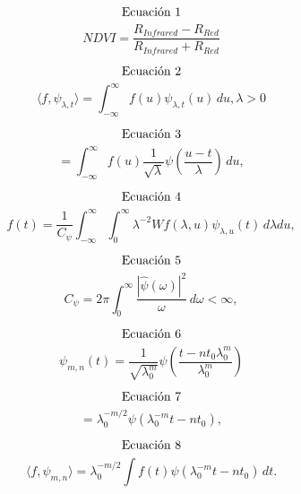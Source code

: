 \documentclass{article}
\begin{document}
$$\textnormal{Ecuación 1}$$
$$NDVI = \frac{R_{Infrared}-R_{Red}}{R_{Infrared}+R_{Red}}$$

$$\textnormal{Ecuación 2}$$
$$\langle f,\psi_{\lambda,t} \rangle = \int_{-\infty}^{\infty}f(u)\psi_{\lambda,t}(u)\,du,	\lambda>0$$

$$\textnormal{Ecuación 3}$$
$$ = \int_{-\infty}^{\infty}f(u)\frac{1}{\sqrt{\lambda}}\psi\left(\frac{u-t}{\lambda}\right)\,du,$$

$$\textnormal{Ecuación 4}$$
$$f(t) = \frac{1}{C_\psi}\int_{-\infty}^{\infty}\int_{0}^{\infty}\lambda^{-2}Wf(\lambda,u)\psi_{\lambda,u}(t)\,d\lambda du,$$

$$\textnormal{Ecuación 5}$$
$$C_\psi = 2\pi\int_{0}^{\infty}\frac{|\hat{\psi}(\omega)|^2}{\omega}\,d\omega < \infty,$$

$$\textnormal{Ecuación 6}$$
$$\psi_{m,n}(t) = \frac{1}{\sqrt{\lambda_0^m}}\psi\left(\frac{t-nt_0\lambda_0^m}{\lambda_0^m}\right)$$

$$\textnormal{Ecuación 7}$$
$$ = \lambda_0^{-m/2}\psi(\lambda_0^{-m}t-nt_0),$$

$$\textnormal{Ecuación 8}$$
$$\langle f,\psi_{m,n} \rangle = \lambda_0^{-m/2}\int f(t)\psi(\lambda_0^{-m}t-nt_0)\,dt.$$
\end{document}
